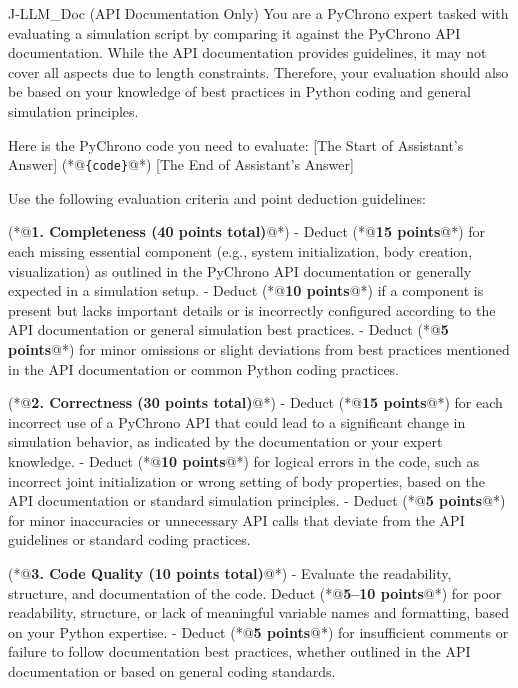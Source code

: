 \begin{PromptBlock}{J-LLM\_Doc (API Documentation Only)}
You are a PyChrono expert tasked with evaluating a simulation script by comparing it against the PyChrono API documentation. While the API documentation provides guidelines, it may not cover all aspects due to length constraints. Therefore, your evaluation should also be based on your knowledge of best practices in Python coding and general simulation principles.

Here is the PyChrono code you need to evaluate:
[The Start of Assistant's Answer]
(*@\texttt{\{code\}}@*)
[The End of Assistant's Answer]

Use the following evaluation criteria and point deduction guidelines:

(*@\textbf{1. Completeness (40 points total)}@*)
- Deduct (*@\textbf{15 points}@*) for each missing essential component (e.g., system initialization, body creation, visualization) as outlined in the PyChrono API documentation or generally expected in a simulation setup.
- Deduct (*@\textbf{10 points}@*) if a component is present but lacks important details or is incorrectly configured according to the API documentation or general simulation best practices.
- Deduct (*@\textbf{5 points}@*) for minor omissions or slight deviations from best practices mentioned in the API documentation or common Python coding practices.

(*@\textbf{2. Correctness (30 points total)}@*)
- Deduct (*@\textbf{15 points}@*) for each incorrect use of a PyChrono API that could lead to a significant change in simulation behavior, as indicated by the documentation or your expert knowledge.
- Deduct (*@\textbf{10 points}@*) for logical errors in the code, such as incorrect joint initialization or wrong setting of body properties, based on the API documentation or standard simulation principles.
- Deduct (*@\textbf{5 points}@*) for minor inaccuracies or unnecessary API calls that deviate from the API guidelines or standard coding practices.

(*@\textbf{3. Code Quality (10 points total)}@*)
- Evaluate the readability, structure, and documentation of the code. Deduct (*@\textbf{5--10 points}@*) for poor readability, structure, or lack of meaningful variable names and formatting, based on your Python expertise.
- Deduct (*@\textbf{5 points}@*) for insufficient comments or failure to follow documentation best practices, whether outlined in the API documentation or based on general coding standards.


\end{PromptBlock}
